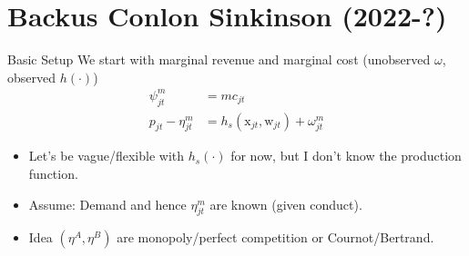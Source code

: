 \documentclass[aspectratio=169,10pt]{beamer}
\begin{document}









\section{Backus Conlon Sinkinson (2022-?)}




\begin{frame}{Basic Setup}
We start with marginal revenue and marginal cost (unobserved $\omega$, observed $h(\cdot)$)
\begin{align*}
\psi_{jt}^{m} &= mc_{jt} \\
p_{jt} -\eta_{jt}^m &= h_s(\textrm{x}_{jt},\textrm{w}_{jt})  + \omega_{jt}^m
\end{align*}
\begin{itemize}
\item Let's be vague/flexible with $h_s(\cdot)$ for now, but I don't know the production function.
\item Assume: Demand and hence $\eta_{jt}^{m}$ are \alert{known (given conduct)}.\\
\item Idea $(\eta^{A},\eta^{B})$ are monopoly/perfect competition or Cournot/Bertrand.
\end{itemize}
\end{frame}
\end{document}
